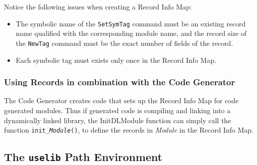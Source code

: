 \documentclass[\pformat,12pt]{article}
\begin{document}
Notice the following issues when creating a Record Info Map:
\begin{itemize}
\item The symbolic name of the {\tt SetSymTag} command must be an
  existing record name qualified with the corresponding module name,
  and the record size of the {\tt NewTag} command must be the exact
  number of fields of the record.
\item Each symbolic tag must exists only once in the Record Info Map.
\end{itemize}


\subsubsection{Using Records in combination with the Code Generator}

The Code Generator creates code that sets up the Record Info Map for
code generated modules.  Thus if generated code is compiling and
linking into a dynamically linked library, the InitDLModule function can
simply call the function {\tt init\_\textit{Module}()}, to define the
records in \textit{Module} in the Record Info Map.

%
%
%
%

\subsection{The \texttt{uselib} Path Environment}
\label{sec:uselibpath}
\end{document}
